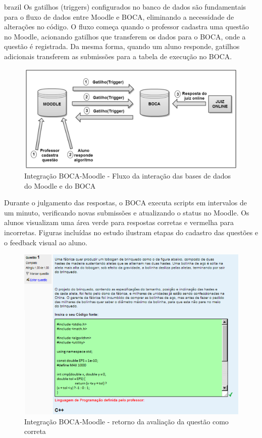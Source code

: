 \begin{otherlanguage*}{brazil}
Os gatilhos (triggers) configurados no banco de dados são fundamentais para o fluxo de dados entre Moodle e BOCA, eliminando a necessidade de alterações no código. O fluxo começa quando o professor cadastra uma questão no Moodle, acionando gatilhos que transferem os dados para o BOCA, onde a questão é registrada. Da mesma forma, quando um aluno responde, gatilhos adicionais transferem as submissões para a tabela de execução no BOCA.

\begin{figure}[h!]
	   \centering
            \caption{Integração BOCA-Moodle - Fluxo da interação das bases de dados do Moodle e do BOCA}
            \label{fig:ModeloConceitual}
	   	\includegraphics[scale=0.3]{pictures/BOCA_fluxo.png}
\end{figure}

Durante o julgamento das respostas, o BOCA executa scripts em intervalos de um minuto, verificando novas submissões e atualizando o status no Moodle. Os alunos visualizam uma área verde para respostas corretas e vermelha para incorretas. Figuras incluídas no estudo ilustram etapas do cadastro das questões e o feedback visual ao aluno.

\begin{figure}[h!]
	   \centering
            \caption{Integração BOCA-Moodle - retorno da avaliação da questão como correta}
            \label{fig:ModeloConceitual}
	   	\includegraphics[scale=0.5]{pictures/BOCA_correta.png}
\end{figure}


\end{otherlanguage*}
